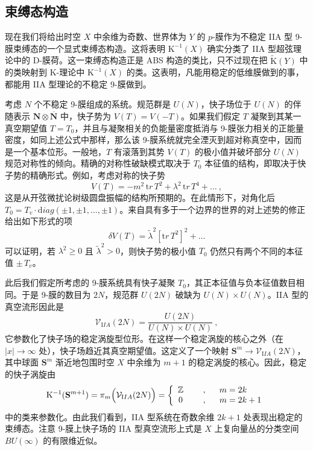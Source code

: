\documentclass[11pt,a4paper]{ctexart}
\newcommand{\SrcRange}[2]{\marginpar{\raggedright\footnotesize 原文 p.#1}}
\begin{document}
\SrcRange{46}{46}
\subsection{束缚态构造}\label{ux675fux7f1aux6001ux6784ux9020-1}

现在我们将给出时空 \(X\) 中余维为奇数、世界体为 \(Y\) 的 \(p\)-膜作为不稳定 IIA 型 9-膜束缚态的一个显式束缚态构造。这将表明 \({\mathrm K}^{-1}(X)\) 确实分类了 IIA 型超弦理论中的 D-膜荷。这一束缚态构造正是 ABS 构造的类比，只不过现在把 \(\widetilde{{\mathrm K}}(Y)\) 中的类映射到 K-理论中 \({\mathrm K}^{-1}(X)\) 的类。这表明，凡能用稳定的低维膜做到的事，都能用 IIA 型理论的不稳定 9-膜做到。

考虑 \(N\) 个不稳定 9-膜组成的系统。规范群是 \(U(N)\)，快子场位于 \(U(N)\) 的伴随表示 \({\mathbf N}\otimes \overline{\mathbf N}\) 中，快子势为 \(V(T)=V(-T)\)。如果我们假定 \(T\) 凝聚到其某一真空期望值 \(T=T_0\)，并且与凝聚相关的负能量密度抵消与 9-膜张力相关的正能量密度，如同上述公式中那样，那么该 9-膜系统就完全湮灭到超对称真空中，因而是一个基本位形。一般地，\(T\) 有滚落到其势 \(V(T)\) 的极小值并破坏部分 \(U(N)\) 规范对称性的倾向。精确的对称性破缺模式取决于 \(T_0\) 本征值的结构，即取决于快子势的精确形式。例如，考虑对称的快子势 \[V(T)=-m^2\,{\mathrm tr}\,T^2+\lambda^2\,{\mathrm tr}\,T^4+\ldots\ ,\] 这是从开弦微扰论树级圆盘振幅的结构所预期的。在此情形下，对角化后 \(T_0=T_v\cdot{\mathrm diag}(\pm 1,\pm1,\ldots, \pm 1)\)。来自具有多于一个边界的世界的对上述势的修正给出如下形式的项 \[\delta V(T)=\tilde{\lambda}^2\left[{\mathrm tr}\,T^2\right]^2+\ldots\] 可以证明，若 \(\lambda^2\geq 0\) 且 \(\tilde{\lambda}^2>0\)，则快子势的极小值 \(T_0\) 仍然只有两个不同的本征值 \(\pm\,T_v\)。

此后我们假定所考虑的 9-膜系统具有快子凝聚 \(T_0\)，其正本征值与负本征值数目相同。于是 9-膜的数目为 \(2N\)，规范群 \(U(2N)\) 破缺为 \(U(N)\times U(N)\)。IIA 型的真空流形因此是 \[{\mathcal V}_{\mathrm IIA}(2N)=\frac{U(2N)}{U(N)\times U(N)}\ ,\] 它参数化了快子场的稳定涡旋型位形。在这样一个稳定涡旋的核心之外（在 \(|x|\rightarrow\infty\) 处），快子场趋近其真空期望值。这定义了一个映射 \({\mathbf S}^m\rightarrow {\mathcal V}_{\mathrm IIA}(2N)\)，其中球面 \({\mathbf S}^m\) 渐近地包围时空 \(X\) 中余维为 \(m+1\) 的稳定涡旋的核心。因此，稳定的快子涡旋由 \[{\mathrm K}^{-1}({\mathbf S}^{m+1})=
\pi_{m}\Bigl({\mathcal V}_{\mathrm IIA}(2N)\Bigr)=\left\{
\begin{array}{cll}{\mathbb{Z}}~~~~&,&~~m=2k\\
0~~~~&,&~~m=2k+1\end{array}\right.\] 中的类来参数化。由此我们看到，IIA 型系统在奇数余维 \(2k+1\) 处表现出稳定的束缚态。注意 9-膜上快子场的 IIA 型真空流形上式是 \(X\) 上复向量丛的分类空间 \(BU(\infty)\) 的有限维近似。
\end{document}
